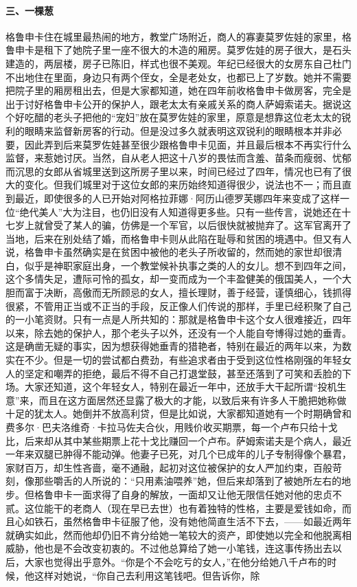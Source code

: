 \paragraph*{三、一棵葱}
\par 格鲁申卡住在城里最热闹的地方，教堂广场附近，商人的寡妻莫罗佐娃的家里，格鲁申卡是租下了她院子里一座不很大的木造的厢房。莫罗佐娃的房子很大，是石头建造的，两层楼，房子已陈旧，样式也很不美观。年纪已经很大的女房东自己杜门不出地住在里面，身边只有两个侄女，全是老处女，也都已上了岁数。她并不需要把院子里的厢房租出去，但是大家都知道，她在四年前收格鲁申卡做房客，完全是出于讨好格鲁申卡公开的保护人，跟老太太有亲戚关系的商人萨姆索诺夫。据说这个好吃醋的老头子把他的“宠妇”放在莫罗佐娃的家里，原意是想靠这位老太太的锐利的眼睛来监督新房客的行动。但是没过多久就表明这双锐利的眼睛根本并非必要，因此弄到后来莫罗佐娃甚至很少跟格鲁申卡见面，并且最后根本不再实行什么监督，来惹她讨厌。当然，自从老人把这十八岁的畏怯而含羞、苗条而瘦弱、忧郁而沉思的女郎从省城里送到这所房子里以来，时间已经过了四年，情况也已有了很大的变化。但我们城里对于这位女郎的来历始终知道得很少，说法也不一；而且直到最近，即使很多的人已开始对阿格拉菲娜·阿历山德罗芙娜四年来变成了这样一位“绝代美人”大为注目，也仍旧没有人知道得更多些。只有一些传言，说她还在十七岁上就曾受了某人的骗，仿佛是一个军官，以后很快就被抛弃了。这军官离开了当地，后来在别处结了婚，而格鲁申卡则从此陷在耻辱和贫困的境遇中。但又有人说，格鲁申卡虽然确实是在贫困中被他的老头子所收留的，然而她的家世却很清白，似乎是神职家庭出身，一个教堂候补执事之类的人的女儿。想不到四年之间，这个多情失足，遭际可怜的孤女，却一变而成为一个丰盈健美的俄国美人，一个大胆而富于决断，高傲而无所顾忌的女人，擅长理财，善于经营，谨慎细心，钱抓得很紧，不管用正当或不正当的手段，反正像人们传说的那样，手里已经积聚了自己的一小笔资财。只有一点是人所共知的：那就是格鲁申卡这个女人很难接近，四年以来，除去她的保护人，那个老头子以外，还没有一个人能自夸博得过她的垂青。这是确凿无疑的事实，因为想获得她垂青的猎艳者，特别在最近的两年以来，为数实在不少。但是一切的尝试都白费劲，有些追求者由于受到这位性格刚强的年轻女人的坚定和嘲弄的拒绝，最后不得不自己打退堂鼓，甚至还落到了可笑和丢脸的下场。大家还知道，这个年轻女人，特别在最近一年中，还放手大干起所谓“投机生意”来，而且在这方面居然还显露了极大的才能，以致后来有许多人干脆把她称做十足的犹太人。她倒并不放高利贷，但是比如说，大家都知道她有一个时期确曾和费多尔·巴夫洛维奇·卡拉马佐夫合伙，用贱价收买期票，每一个卢布只给十戈比，后来却从其中某些期票上花十戈比赚回一个卢布。萨姆索诺夫是个病人，最近一年来双腿已肿得不能动弹。他妻子已死，对几个已成年的儿子专制得像个暴君，家财百万，却生性吝啬，毫不通融，起初对这位被保护的女人严加约束，百般苛刻，像那些嚼舌的人所说的：“只用素油喂养”她，但后来却落到了被她所左右的地步。但格鲁申卡一面求得了自身的解放，一面却又让他无限信任她对他的忠贞不贰。这位能干的老商人（现在早已去世）也有着独特的性格，主要是爱钱如命，而且心如铁石，虽然格鲁申卡征服了他，没有她他简直生活不下去，——如最近两年就确实如此，然而他却仍旧不肯分给她一笔较大的资产，即使她以完全和他脱离相威胁，他也是不会改变初衷的。不过他总算给了她一小笔钱，连这事传扬出去以后，大家也觉得出乎意外。“你是个不会吃亏的女人，”在他分给她八千卢布的时候，他这样对她说，“你自己去利用这笔钱吧。但告诉你，除